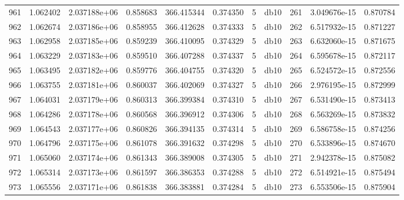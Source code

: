 \begin{tabular}{lrrrrrrlrrr}
961  &    1.062402 &        2.037188e+06 &  0.858683 &              366.415344 &    0.374350 &       5 &         db10 &    261 &   3.049676e-15 &      0.870784 \\
962  &    1.062674 &        2.037186e+06 &  0.858955 &              366.412628 &    0.374333 &       5 &         db10 &    262 &   6.517932e-15 &      0.871227 \\
963  &    1.062958 &        2.037185e+06 &  0.859239 &              366.410095 &    0.374329 &       5 &         db10 &    263 &   6.632060e-15 &      0.871675 \\
964  &    1.063229 &        2.037183e+06 &  0.859510 &              366.407288 &    0.374337 &       5 &         db10 &    264 &   6.595678e-15 &      0.872117 \\
965  &    1.063495 &        2.037182e+06 &  0.859776 &              366.404755 &    0.374320 &       5 &         db10 &    265 &   6.524572e-15 &      0.872556 \\
966  &    1.063755 &        2.037181e+06 &  0.860037 &              366.402069 &    0.374327 &       5 &         db10 &    266 &   2.976195e-15 &      0.872999 \\
967  &    1.064031 &        2.037179e+06 &  0.860313 &              366.399384 &    0.374310 &       5 &         db10 &    267 &   6.531490e-15 &      0.873413 \\
968  &    1.064286 &        2.037178e+06 &  0.860568 &              366.396912 &    0.374306 &       5 &         db10 &    268 &   6.563269e-15 &      0.873832 \\
969  &    1.064543 &        2.037177e+06 &  0.860826 &              366.394135 &    0.374314 &       5 &         db10 &    269 &   6.586758e-15 &      0.874256 \\
970  &    1.064796 &        2.037175e+06 &  0.861078 &              366.391632 &    0.374298 &       5 &         db10 &    270 &   6.533896e-15 &      0.874670 \\
971  &    1.065060 &        2.037174e+06 &  0.861343 &              366.389008 &    0.374305 &       5 &         db10 &    271 &   2.942378e-15 &      0.875082 \\
972  &    1.065314 &        2.037173e+06 &  0.861597 &              366.386353 &    0.374288 &       5 &         db10 &    272 &   6.514921e-15 &      0.875494 \\
973  &    1.065556 &        2.037171e+06 &  0.861838 &              366.383881 &    0.374284 &       5 &         db10 &    273 &   6.553506e-15 &      0.875904 \\

\end{tabular}
